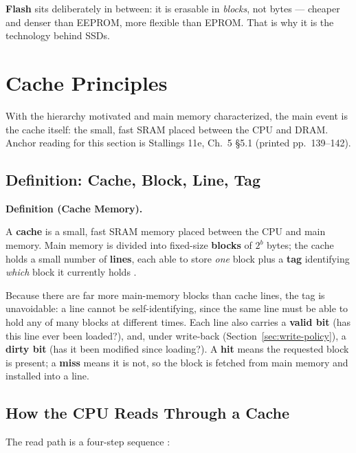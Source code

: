 \documentclass[11pt]{article}
\newenvironment{definitionbox}[1]{%
  \par\noindent\textbf{Definition (#1).}\ \itshape
}{\par\vspace{0.3em}}
\begin{document}
\textbf{Flash} sits deliberately in between: it is erasable in \emph{blocks}, not bytes --- cheaper and denser than EEPROM, more flexible than EPROM. That is why it is the technology behind SSDs.

\section{Cache Principles}
\label{sec:principles}

With the hierarchy motivated and main memory characterized, the main event is the cache itself: the small, fast SRAM placed between the CPU and DRAM. Anchor reading for this section is Stallings 11e, Ch.~5 \S5.1 (printed pp.~139--142).

\subsection{Definition: Cache, Block, Line, Tag}

\begin{definitionbox}{Cache Memory}
A \textbf{cache} is a small, fast SRAM memory placed between the CPU and main memory. Main memory is divided into fixed-size \textbf{blocks} of $2^b$ bytes; the cache holds a small number of \textbf{lines}, each able to store \emph{one} block plus a \textbf{tag} identifying \emph{which} block it currently holds \cite[\S5.1, printed pp.~139--142]{Stallings2015_computer_organization}.
\end{definitionbox}

Because there are far more main-memory blocks than cache lines, the tag is unavoidable: a line cannot be self-identifying, since the same line must be able to hold any of many blocks at different times. Each line also carries a \textbf{valid bit} (has this line ever been loaded?), and, under write-back (Section~\ref{sec:write-policy}), a \textbf{dirty bit} (has it been modified since loading?). A \textbf{hit} means the requested block is present; a \textbf{miss} means it is not, so the block is fetched from main memory and installed into a line.

\subsection{How the CPU Reads Through a Cache}

The read path is a four-step sequence \cite[Fig.~5.3, PDF p.~182]{Stallings2015_computer_organization}:
\end{document}
